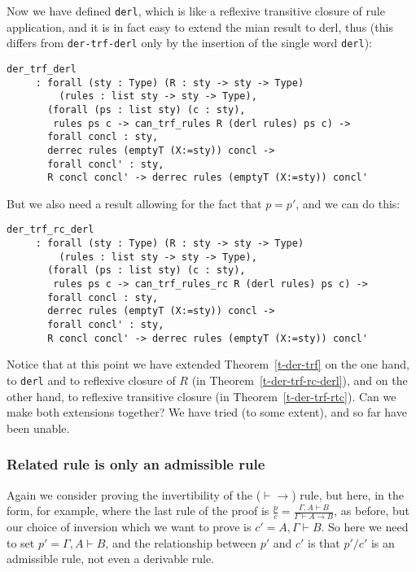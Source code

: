 \documentclass[a4paper,12pt]{llncs}
\begin{document}
Now we have defined \texttt{derl}, which is like a reflexive transitive closure
of rule application, and it is in fact easy to extend the mian result to 
derl, thus (this differs from \texttt{der-trf-derl} 
only by the insertion of the single word \texttt{derl}):

\begin{theorem}\label{t-der-trf-derl}
\end{theorem}
\begin{verbatim}
der_trf_derl
     : forall (sty : Type) (R : sty -> sty -> Type)
         (rules : list sty -> sty -> Type),
       (forall (ps : list sty) (c : sty),
        rules ps c -> can_trf_rules R (derl rules) ps c) ->
       forall concl : sty,
       derrec rules (emptyT (X:=sty)) concl ->
       forall concl' : sty,
       R concl concl' -> derrec rules (emptyT (X:=sty)) concl'
\end{verbatim}

But we also need a result allowing for the fact that $p = p'$, and we can do
this:

\begin{theorem}\label{t-der-trf-rc-derl}
\end{theorem}
\begin{verbatim}
der_trf_rc_derl
     : forall (sty : Type) (R : sty -> sty -> Type)
         (rules : list sty -> sty -> Type),
       (forall (ps : list sty) (c : sty),
        rules ps c -> can_trf_rules_rc R (derl rules) ps c) ->
       forall concl : sty,
       derrec rules (emptyT (X:=sty)) concl ->
       forall concl' : sty,
       R concl concl' -> derrec rules (emptyT (X:=sty)) concl'
\end{verbatim}

Notice that at this point we have extended Theorem~\ref{t-der-trf}
on the one hand, to \texttt{derl} and to reflexive closure of $R$
(in Theorem~\ref{t-der-trf-rc-derl}),
and on the other hand, to reflexive transitive closure 
(in Theorem~\ref{t-der-trf-rtc}).
Can we make both extensions together?  We have tried (to some extent), and
so far have been unable.

\subsubsection{Related rule is only an admissible rule}\label{s-rc-adm}
Again we consider proving the invertibility of the ($\vdash\to$) rule,
but here, in the form, for example, where the last rule of the proof is 
$\displaystyle \frac p c = \frac {\Gamma, A \vdash B} {\Gamma \vdash A \to B}$, 
as before, but our choice of inversion which we want to prove is
$c' = {A, \Gamma \vdash B}$.
So here we need to set $p' = {\Gamma, A \vdash B}$, and the 
relationship between $p'$ and $c'$ is that $p'/c'$ is an admissible rule,
not even a derivable rule.
\end{document}
